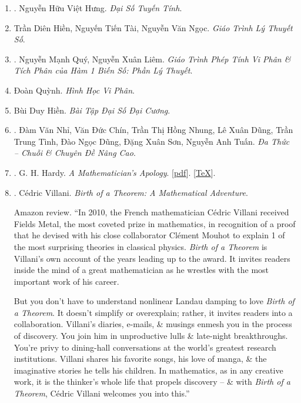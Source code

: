 \documentclass{article}
\begin{document}
\begin{enumerate}
	\item \cite{Hung_linear_algebra}. {\sc Nguyễn Hữu Việt Hưng}. {\it Đại Số Tuyến Tính}.\hfill{\sf[reading]}

	\item Trần Diên Hiền, Nguyến Tiến Tài, Nguyễn Văn Ngọc. {\it Giáo Trình Lý Thuyết Số}.

	\item \cite{Quy_Liem2012}. Nguyễn Mạnh Quý, Nguyễn Xuân Liêm. {\it Giáo Trình Phép Tính Vi Phân \& Tích Phân của Hàm 1 Biến Số: Phần Lý Thuyết}.\hfill{\sf[reading]}

	\item Đoàn Quỳnh. {\it Hình Học Vi Phân}.

	\item Bùi Duy Hiền. {\it Bài Tập Đại Số Đại Cương}.

	\item \cite{Nhi_Chin_Dung_Dung_Tinh_Dung_Son_Tuan2017}. Đàm Văn Nhỉ, Văn Đức Chín, Trần Thị Hồng Nhung, Lê Xuân Dũng, Trần Trung Tình, Đào Ngọc Dũng, Đặng Xuân Sơn, Nguyễn Anh Tuấn. {\it Đa Thức -- Chuỗi \& Chuyên Đề Nâng Cao}.

	\item \cite{Hardy1940, Hardy1992, Hardy2022}. G. H. Hardy. {\it A Mathematician's Apology}. [\href{https://github.com/NQBH/hobby/blob/master/advanced_mathematics/Hardy2017/NQBH_Hardy2017.pdf}{pdf}]. [\href{https://github.com/NQBH/hobby/blob/master/advanced_mathematics/Hardy2017/NQBH_Hardy2017.tex}{\TeX}].\hfill{\sf[done]}

	\item \cite{Villani2015}. {\sc C\'edric Villani}. {\it Birth of a Theorem: A Mathematical Adventure}. {}

	{\sf Amazon review.} ``In 2010, the French mathematician {\sc C\'edric Villani} received Fields Metal, the most coveted prize in mathematics, in recognition of a proof that he devised with his close collaborator {\sc Cl\'ement Mouhot} to explain 1 of the most surprising theories in classical physics. {\it Birth of a Theorem} is {\sc Villani}'s own account of the years leading up to the award. It invites readers inside the mind of a great mathematician as he wrestles with the most important work of his career.

	But you don't have to understand nonlinear Landau damping to love {\it Birth of a Theorem}. It doesn't simplify or overexplain; rather, it invites readers into a collaboration. {\sc Villani}'s diaries, e-mails, \& musings enmesh you in the process of discovery. You join him in unproductive lulls \& late-night breakthroughs. You're privy to dining-hall conversations at the world's greatest research institutions. {\sc Villani} shares his favorite songs, his love of manga, \& the imaginative stories he tells his children. In mathematics, as in any creative work, it is the thinker's whole life that propels discovery -- \& with {\it Birth of a Theorem}, {\sc C\'edric Villani} welcomes you into this.''


\end{enumerate}
\end{document}
